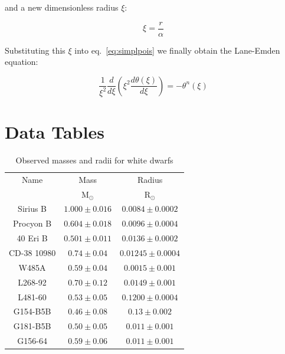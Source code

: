 \documentclass[twoside]{article}
\begin{document}
            and a new dimensionless radius \(\xi\):

            \begin{equation}
                \label{eq:xi}
                \xi=\frac{r}{\alpha}
            \end{equation}

            Substituting this \(\xi\) into eq.~\ref{eq:simplpois} we finally
            obtain the Lane-Emden equation:

            \begin{equation}
                \frac{1}{\xi^2}\frac{d}{d\xi}\left(\xi^2\frac{d\theta(\xi)}{d\xi}\right)=-\theta^n(\xi)
            \end{equation}

\section{Data Tables}

\begin{table}[H]
    \caption{Observed masses and radii for white dwarfs}
    \centering
    \begin{tabular}{c c c}
    \toprule
    Name & Mass & Radius \\
         & \(\mathrm{M}_{\odot}\) & \(\mathrm{R}_{\odot}\) \\
    \midrule
    Sirius B & \(1.000\pm0.016\) & \(0.0084\pm0.0002\) \\
    Procyon B & \(0.604\pm0.018\) & \(0.0096\pm0.0004\) \\
    40 Eri B & \(0.501\pm0.011\) & \(0.0136\pm0.0002\) \\
    CD-38 10980 & \(0.74\pm0.04\) & \(0.01245\pm0.0004\) \\
    W485A & \(0.59\pm0.04\) & \(0.0015\pm0.001\) \\
    L268-92 & \(0.70\pm0.12\) & \(0.0149\pm0.001\) \\
    L481-60 & \(0.53\pm0.05\) & \(0.1200\pm0.0004\) \\
    G154-B5B & \(0.46\pm0.08\) & \(0.13\pm0.002\) \\
    G181-B5B & \(0.50\pm0.05\) & \(0.011\pm0.001\) \\
    G156-64 & \(0.59\pm0.06\) & \(0.011\pm0.001\) \\
    \bottomrule
    \end{tabular}
\end{table}
\end{document}
